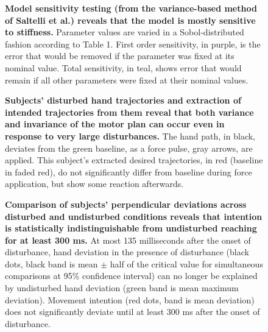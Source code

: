 \documentclass[10pt]{article}
\begin{document}
\begin{figure}[!ht]
\begin{center}
\end{center}
\caption{
{\bf Model sensitivity testing (from the variance-based method of Saltelli et al.\cite{saltelli2010variance}) reveals that the model is mostly sensitive to stiffness.} Parameter values are varied in a Sobol-distributed fashion according to Table 1. First order sensitivity, in purple, is the error that would be removed if the parameter was fixed at its nominal value. Total sensitivity, in teal, shows error that would remain if all other parameters were fixed at their nominal values.
}
\label{fig:sensitivity}
\end{figure}

\begin{figure}[!ht]
\begin{center}
\end{center}
\caption{
{\bf Subjects' disturbed hand trajectories and extraction of intended trajectories from them reveal that both variance and invariance of the motor plan can occur even in response to very large disturbances.} The hand path, in black, deviates from the green baseline, as a force pulse, gray arrows, are applied. This subject's extracted desired trajectories, in red (baseline in faded red), do not significantly differ from baseline during force application, but show some reaction afterwards.
}
\label{fig:anecdotes}
\end{figure}

\begin{figure}[!ht]
\begin{center}
\end{center}
\caption{
{\bf Comparison of subjects' perpendicular deviations across disturbed and undisturbed conditions reveals that intention is statistically indistinguishable from undisturbed reaching for at least 300 ms.} At most 135 milliseconds after the onset of disturbance, hand deviation in the presence of disturbance (black dots, black band is mean $\pm$ half of the critical value for simultaneous comparisons at 95\% confidence interval) can no longer be explained by undisturbed hand deviation (green band is mean maximum deviation). Movement intention (red dots, band is mean deviation) does not significantly deviate until at least 300 ms after the onset of disturbance.
}
\label{fig:grouptrends}
\end{figure}
\end{document}
